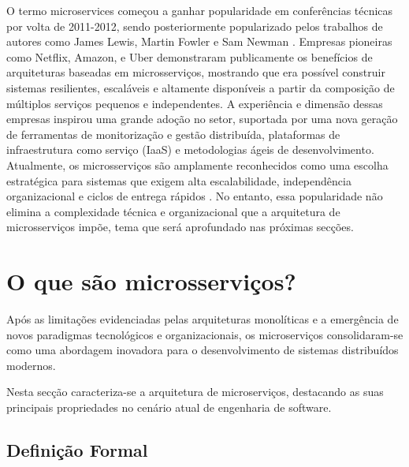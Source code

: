 O termo microservices começou a ganhar popularidade em conferências técnicas por volta de 2011-2012, sendo posteriormente popularizado pelos trabalhos de autores como James Lewis, Martin Fowler e Sam Newman \cite{Lewis2014,Newman2015}. Empresas pioneiras como Netflix, Amazon, e Uber demonstraram publicamente os benefícios de arquiteturas baseadas em microsserviços, mostrando que era possível construir sistemas resilientes, escaláveis e altamente disponíveis a partir da composição de múltiplos serviços pequenos e independentes.
A experiência e dimensão dessas empresas inspirou uma grande adoção no setor, suportada por uma nova geração de ferramentas de monitorização e gestão distribuída, plataformas de infraestrutura como serviço (IaaS) e metodologias ágeis de desenvolvimento.
Atualmente, os microsserviços são amplamente reconhecidos como uma escolha estratégica para sistemas que exigem alta escalabilidade, independência organizacional e ciclos de entrega rápidos \cite{Dragoni2017}. No entanto, essa popularidade não elimina a complexidade técnica e organizacional que a arquitetura de microsserviços impõe, tema que será aprofundado nas próximas secções.


\section{O que são microsserviços?}

Após as limitações evidenciadas pelas arquiteturas monolíticas e a emergência de novos paradigmas tecnológicos e organizacionais, os microserviços consolidaram-se como uma abordagem inovadora para o desenvolvimento de sistemas distribuídos modernos.

Nesta secção caracteriza-se a arquitetura de microserviços, destacando as suas principais propriedades no cenário atual de engenharia de software.

\subsection{Definição Formal}

